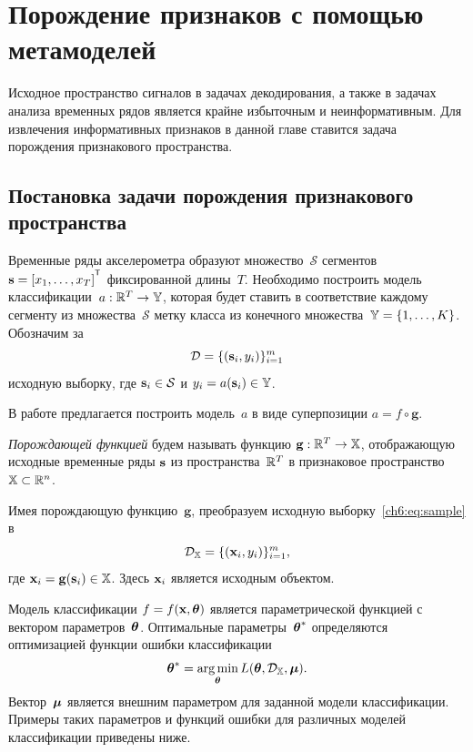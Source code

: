 \chapter{Порождение признаков с помощью метамоделей}
\label{ch:metamodels}

Исходное пространство сигналов в задачах декодирования, а также в задачах анализа временных рядов является крайне избыточным и неинформативным.
Для извлечения информативных признаков в данной главе ставится задача порождения признакового пространства.

\section{Постановка задачи порождения признакового пространства}
\label{sec:ch6:feature_generation}

Временные ряды акселерометра образуют множество~$\mathcal{S}$ сегментов~$\bs = [x_1, \dots, x_T]^{\T}$ фиксированной длины~$T$.
Необходимо построить модель классификации~$a: \mathbb{R}^T \rightarrow \mathbb{Y}$, которая будет ставить в соответствие каждому сегменту из множества~$\mathcal{S}$ метку класса из конечного множества~$\mathbb{Y} = \{1, \dots, K\}$.
Обозначим за
\begin{equation}
	\mathcal{D} = \{(\mathbf{s}_i, y_i)\}_{i=1}^m
	\label{ch6:eq:sample}
\end{equation}
исходную выборку, где $\mathbf{s}_i \in \mathcal{S}$ и $y_i = a(\mathbf{s}_i)\in \mathbb{Y}$.

В работе предлагается построить модель~$a$ в виде суперпозиции $a = f \circ \mathbf{g}$.
\begin{definition}
	\textit{Порождающей функцией} будем называть функцию $\mathbf{g}: \mathbb{R}^T \rightarrow \mathbb{X}$, отображающую исходные временные ряды $\mathbf{s}$ из пространства~$\mathbb{R}^{T} $ в признаковое пространство~$\mathbb{X} \subset \mathbb{R}^n$.
\end{definition}
Имея порождающую функцию~$\mathbf{g}$, преобразуем исходную выборку~\eqref{ch6:eq:sample} в
\[
	\mathcal{D}_{\mathbb{X}} = \{(\mathbf{x}_i, y_i)\}_{i=1}^m,
\]
где $\mathbf{x}_i = \mathbf{g}(\mathbf{s}_i) \in \mathbb{X}$. Здесь $\mathbf{x}_i$ является исходным объектом.

Модель классификации $f=f(\mathbf{x}, \boldsymbol{\theta})$ является параметрической функцией с вектором параметров~$\boldsymbol{\theta}$. 
Оптимальные параметры~$\boldsymbol{\theta}^*$ определяются оптимизацией функции ошибки классификации
\begin{equation}
	\boldsymbol{\theta}^* = \mathop{\arg \min}\limits_{\boldsymbol{\theta}} L(\boldsymbol{\theta}, \mathcal{D}_{\mathbb{X}}, \boldsymbol{\mu}).
	\label{ch6:eq:optimal_classification_params}
\end{equation}
Вектор~$\boldsymbol{\mu}$ является внешним параметром для заданной модели классификации. 
Примеры таких параметров и функций ошибки для различных моделей классификации приведены ниже.

